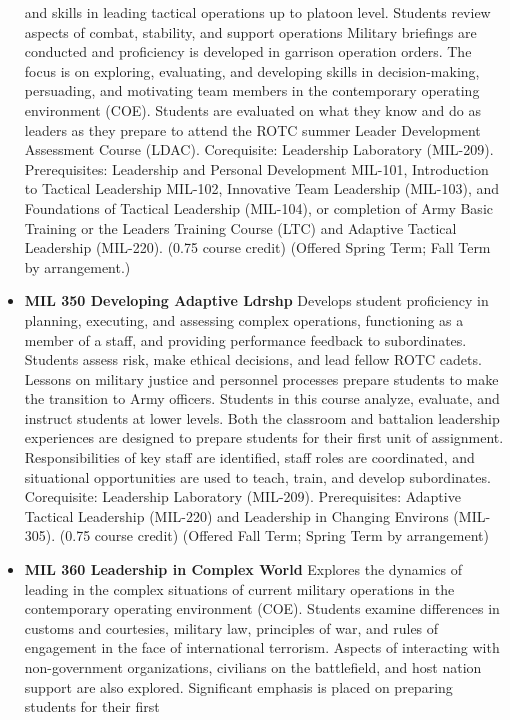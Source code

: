 \documentclass[
  letterpaper,
]{scrbook}
\begin{document}
\begin{itemize}
  and skills in leading tactical operations up to platoon level.
  Students review aspects of combat, stability, and support operations
  Military briefings are conducted and proficiency is developed in
  garrison operation orders. The focus is on exploring, evaluating, and
  developing skills in decision-making, persuading, and motivating team
  members in the contemporary operating environment (COE). Students are
  evaluated on what they know and do as leaders as they prepare to
  attend the ROTC summer Leader Development Assessment Course (LDAC).
  Corequisite: Leadership Laboratory (MIL-209). Prerequisites:
  Leadership and Personal Development MIL-101, Introduction to Tactical
  Leadership MIL-102, Innovative Team Leadership (MIL-103), and
  Foundations of Tactical Leadership (MIL-104), or completion of Army
  Basic Training or the Leaders Training Course (LTC) and Adaptive
  Tactical Leadership (MIL-220). (0.75 course credit) (Offered Spring
  Term; Fall Term by arrangement.)
\item
  \textbf{MIL 350 Developing Adaptive Ldrshp} Develops student
  proficiency in planning, executing, and assessing complex operations,
  functioning as a member of a staff, and providing performance feedback
  to subordinates. Students assess risk, make ethical decisions, and
  lead fellow ROTC cadets. Lessons on military justice and personnel
  processes prepare students to make the transition to Army officers.
  Students in this course analyze, evaluate, and instruct students at
  lower levels. Both the classroom and battalion leadership experiences
  are designed to prepare students for their first unit of assignment.
  Responsibilities of key staff are identified, staff roles are
  coordinated, and situational opportunities are used to teach, train,
  and develop subordinates. Corequisite: Leadership Laboratory
  (MIL-209). Prerequisites: Adaptive Tactical Leadership (MIL-220) and
  Leadership in Changing Environs (MIL-305). (0.75 course credit)
  (Offered Fall Term; Spring Term by arrangement)
\item
  \textbf{MIL 360 Leadership in Complex World} Explores the dynamics of
  leading in the complex situations of current military operations in
  the contemporary operating environment (COE). Students examine
  differences in customs and courtesies, military law, principles of
  war, and rules of engagement in the face of international terrorism.
  Aspects of interacting with non-government organizations, civilians on
  the battlefield, and host nation support are also explored.
  Significant emphasis is placed on preparing students for their first

\end{itemize}
\end{document}
